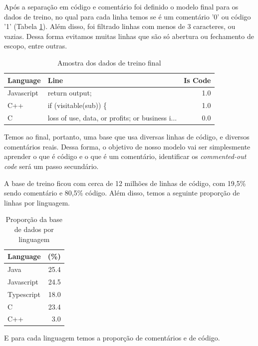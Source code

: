\documentclass[12pt]{article}
\begin{document}
Após a separação em código e comentário foi definido o modelo final para os dados de treino,
no qual para cada linha temos se é um comentário '0' ou código '1' (Tabela \ref{tab:amostra-dados}). Além disso, foi filtrado
linhas com menos de 3 caracteres, ou vazias. Dessa forma evitamos muitas linhas que são só 
abertura ou fechamento de escopo, entre outras.

\begin{table}[ht]
  \centering
  \caption{Amostra dos dados de treino final}
  \label{tab:amostra-dados}
  \begin{tabular}{llr}
    Language & Line & Is Code\\[0.5ex]
    \hline
    Javascript	& return output; &	1.0\\[0.5ex]
    C++ &	if (visitable(sub)) \{ &	1.0\\[0.5ex]
	  C	& loss of use, data, or profits; or business i... &	0.0\\[0.5ex]
    \hline
  \end{tabular}
\end{table}

Temos ao final, portanto, uma base que usa diversas linhas de código, e diversos comentários
reais. Dessa forma, o objetivo de nosso modelo vai ser simplesmente aprender o que é código e
o que é um comentário, identificar os \textit{commented-out code} será um passo secundário. 

A base de treino ficou com cerca de 12 milhões de linhas de código, com 19,5\% sendo comentário 
e 80,5\% código. Além disso, temos a seguinte proporção de linhas por linguagem.

\begin{table}[ht]
  \centering
  \caption{Proporção da base de dados por linguagem}
  \label{tab:prop}
  \begin{tabular}{lr}
    Language & (\%) \\[0.5ex]
    \hline
    Java & 25.4 \\[0.5ex]
    Javascript	& 24.5 \\[0.5ex]
    Typescript & 18.0 \\[0.5ex]
    C	& 23.4 \\[0.5ex]
    C++ &	3.0 \\[0.5ex]
    \hline
  \end{tabular}
\end{table}

E para cada linguagem temos a proporção de comentários e de código.
\end{document}
